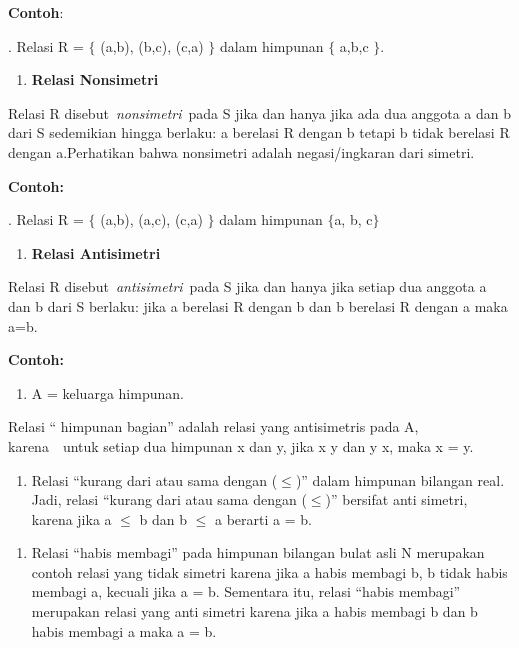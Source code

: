 \documentclass[11pt,fleqn]{book} %
\begin{document}
\noindent 

\noindent \textbf{Contoh}:

\noindent 

. Relasi R = $\{$ (a,b), (b,c), (c,a) $\}$ dalam himpunan $\{$ a,b,c $\}$.

\noindent \textbf{}

\begin{enumerate}
\item \textbf{ Relasi Nonsimetri}
\end{enumerate}

\noindent Relasi R disebut~\textit{nonsimetri}~pada S jika dan hanya jika ada dua anggota a dan b dari S sedemikian hingga berlaku: a berelasi R dengan b tetapi b tidak berelasi R dengan a.Perhatikan bahwa nonsimetri adalah negasi/ingkaran dari simetri.

\noindent \textbf{Contoh:}

. Relasi R = $\{$ (a,b), (a,c), (c,a) $\}$ dalam himpunan $\{$a, b, c$\}$

\noindent \textbf{}

\begin{enumerate}
\item \textbf{ Relasi Antisimetri}
\end{enumerate}

\noindent Relasi R disebut~\textit{antisimetri}~pada S jika dan hanya jika setiap dua anggota a dan b dari S berlaku: jika a berelasi R dengan b dan b berelasi R dengan a maka a=b.

\noindent \textbf{Contoh:}

\begin{enumerate}
\item \textbf{ }A = keluarga himpunan. 
\end{enumerate}

\noindent Relasi `` himpunan bagian'' adalah relasi yang antisimetris pada A, karena~~untuk setiap dua himpunan x dan y, jika x y dan y x, maka x = y.

\begin{enumerate}
\item  Relasi ``kurang dari atau sama dengan ($\mathrm{\le}$)'' dalam himpunan bilangan real. Jadi, relasi ``kurang dari atau sama dengan ($\mathrm{\le}$)'' bersifat anti simetri, karena jika a $\mathrm{\le}$ b dan b $\mathrm{\le}$ a berarti a = b.
\end{enumerate}

\noindent 

\begin{enumerate}
\item  Relasi ``habis membagi'' pada himpunan bilangan bulat asli N merupakan contoh relasi yang tidak simetri karena jika a habis membagi b, b tidak habis membagi a, kecuali jika a = b. Sementara itu, relasi ``habis membagi'' merupakan relasi yang anti simetri karena jika a habis membagi b dan b habis membagi a maka a = b.
\end{enumerate}
\end{document}
